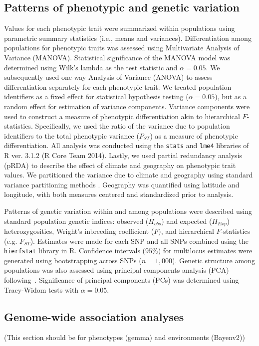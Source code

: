 \documentclass[smallextended]{svjour3}
\begin{document}
\subsection*{Patterns of phenotypic and genetic variation}

Values for each phenotypic trait were summarized  within populations using
parametric summary statistics (i.e., means and variances). Differentiation among
populations for phenotypic traits was assessed using Multivariate Analysis of
Variance (MANOVA). Statistical significance of the MANOVA model was determined
using Wilk's lambda as the test statistic and $\alpha = 0.05$. We subsequently
used one-way Analysis of Variance (ANOVA) to assess differentiation separately
for each phenotypic trait. We treated population identifiers as a fixed effect
for statistical hypothesis testing ($\alpha = 0.05$), but as a random effect for
estimation of variance components. Variance components were used to construct a
measure of phenotypic differentiation akin to hierarchical $F$-statistics.
Specifically, we used the ratio of the variance due to population identifiers to
the total phenotypic variance ($P_{ST}$) as a measure of phenotypic
differentiation. All analysis was conducted using the \texttt{stats} and
\texttt{lme4} libraries of R ver. 3.1.2 (R Core Team 2014). Lastly, we used
partial redundancy analysis (pRDA) to describe the effect of climate and
geography on phenotypic trait values. We partitioned the variance due to climate
and geography using standard variance partitioning methods \citep{Borcard:1992}.
Geography was quantified using latitude and longitude, with both measures
centered and standardized prior to analysis.

Patterns of genetic variation within and among populations were described using
standard population genetic indices: observed ($H_{obs}$) and expected
($H_{Exp}$) heterozygosities, Wright's inbreeding coefficient ($F$), and
hierarchical $F$-statistics (e.g. $F_{ST}$). Estimates were made for each SNP
and all SNPs combined using the \texttt{hierfstat} library in R. Confidence
intervals ($95\%$) for multilocus estimates were generated using bootstrapping
across SNPs ($n = 1,000$). Genetic structure among populations was also assessed
using principal components analysis (PCA) following~\cite{Patterson:2006}.
Significance of principal components (PCs) was determined using Tracy-Widom
tests with $\alpha = 0.05$.


\subsection*{Genome-wide association analyses}
(This section should be for phenotypes (gemma) and environments (Bayenv2))
\end{document}
